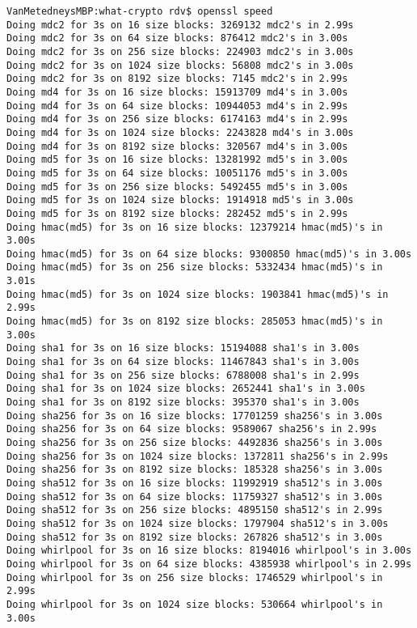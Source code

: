 \documentclass[%
 aip,
 jmp,%
 amsmath,amssymb,
 reprint,%
]{revtex4-1}
\begin{document}
\begin{verbatim}
VanMetedneysMBP:what-crypto rdv$ openssl speed
Doing mdc2 for 3s on 16 size blocks: 3269132 mdc2's in 2.99s
Doing mdc2 for 3s on 64 size blocks: 876412 mdc2's in 3.00s
Doing mdc2 for 3s on 256 size blocks: 224903 mdc2's in 3.00s
Doing mdc2 for 3s on 1024 size blocks: 56808 mdc2's in 3.00s
Doing mdc2 for 3s on 8192 size blocks: 7145 mdc2's in 2.99s
Doing md4 for 3s on 16 size blocks: 15913709 md4's in 3.00s
Doing md4 for 3s on 64 size blocks: 10944053 md4's in 2.99s
Doing md4 for 3s on 256 size blocks: 6174163 md4's in 2.99s
Doing md4 for 3s on 1024 size blocks: 2243828 md4's in 3.00s
Doing md4 for 3s on 8192 size blocks: 320567 md4's in 3.00s
Doing md5 for 3s on 16 size blocks: 13281992 md5's in 3.00s
Doing md5 for 3s on 64 size blocks: 10051176 md5's in 3.00s
Doing md5 for 3s on 256 size blocks: 5492455 md5's in 3.00s
Doing md5 for 3s on 1024 size blocks: 1914918 md5's in 3.00s
Doing md5 for 3s on 8192 size blocks: 282452 md5's in 2.99s
Doing hmac(md5) for 3s on 16 size blocks: 12379214 hmac(md5)'s in 3.00s
Doing hmac(md5) for 3s on 64 size blocks: 9300850 hmac(md5)'s in 3.00s
Doing hmac(md5) for 3s on 256 size blocks: 5332434 hmac(md5)'s in 3.01s
Doing hmac(md5) for 3s on 1024 size blocks: 1903841 hmac(md5)'s in 2.99s
Doing hmac(md5) for 3s on 8192 size blocks: 285053 hmac(md5)'s in 3.00s
Doing sha1 for 3s on 16 size blocks: 15194088 sha1's in 3.00s
Doing sha1 for 3s on 64 size blocks: 11467843 sha1's in 3.00s
Doing sha1 for 3s on 256 size blocks: 6788008 sha1's in 2.99s
Doing sha1 for 3s on 1024 size blocks: 2652441 sha1's in 3.00s
Doing sha1 for 3s on 8192 size blocks: 395370 sha1's in 3.00s
Doing sha256 for 3s on 16 size blocks: 17701259 sha256's in 3.00s
Doing sha256 for 3s on 64 size blocks: 9589067 sha256's in 2.99s
Doing sha256 for 3s on 256 size blocks: 4492836 sha256's in 3.00s
Doing sha256 for 3s on 1024 size blocks: 1372811 sha256's in 2.99s
Doing sha256 for 3s on 8192 size blocks: 185328 sha256's in 3.00s
Doing sha512 for 3s on 16 size blocks: 11992919 sha512's in 3.00s
Doing sha512 for 3s on 64 size blocks: 11759327 sha512's in 3.00s
Doing sha512 for 3s on 256 size blocks: 4895150 sha512's in 2.99s
Doing sha512 for 3s on 1024 size blocks: 1797904 sha512's in 3.00s
Doing sha512 for 3s on 8192 size blocks: 267826 sha512's in 3.00s
Doing whirlpool for 3s on 16 size blocks: 8194016 whirlpool's in 3.00s
Doing whirlpool for 3s on 64 size blocks: 4385938 whirlpool's in 2.99s
Doing whirlpool for 3s on 256 size blocks: 1746529 whirlpool's in 2.99s
Doing whirlpool for 3s on 1024 size blocks: 530664 whirlpool's in 3.00s

\end{verbatim}
\end{document}
